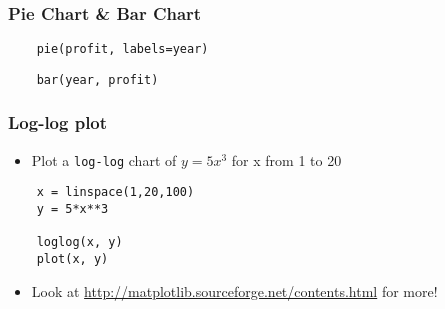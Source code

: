 \begin{frame}[fragile]
  \frametitle{Pie Chart \& Bar Chart}
  \begin{lstlisting}
    pie(profit, labels=year)
  \end{lstlisting}

  \begin{lstlisting}
    bar(year, profit)
  \end{lstlisting}
\end{frame}

\begin{frame}[fragile]
  \frametitle{Log-log plot}
  \begin{itemize}
  \item Plot a \texttt{log-log} chart of $y=5x^3$ for x from 1 to 20
  \end{itemize}
  \begin{lstlisting}
    x = linspace(1,20,100)
    y = 5*x**3

    loglog(x, y)
    plot(x, y)
  \end{lstlisting}
  \begin{itemize}
  \item Look at \url{http://matplotlib.sourceforge.net/contents.html}
    for more!
  \end{itemize}
\end{frame}

